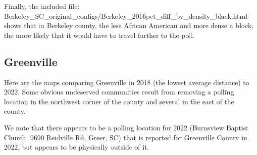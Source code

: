 \documentclass[11pt]{article}
\theoremstyle{remark}
\theoremstyle{definition}
\begin{document}
Finally, the included file: \textrm{Berkeley\_SC\_original\_configs/Berkeley\_2016pct\_diff\_by\_density\_black.html} shows that in Berkeley county, the less African American and more dense a block, the more likely that it would have to travel further to the poll. 

\pagebreak

\subsection{Greenville} 
Here are the maps comparing Greenville in 2018 (the lowest average distance) to 2022. Some obvious undeserved communities result from removing a polling location in the northwest corner of the county and several in the east of the county.

We note that there appears to be a polling location for 2022 (Burnsview Baptist Church, 9690 Reidville Rd, Greer, SC) that is reported for Greenville County in 2022, but appears to be physically outside of it.
\end{document}
